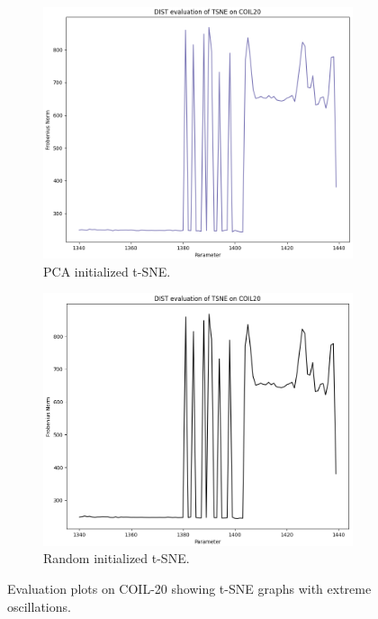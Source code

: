 \begin{figure}[!]
     \centering
     \begin{subfigure}[t]{0.49\columnwidth}
    	\centering
    	\includegraphics[width=\columnwidth]{images/dist_tsne_coil20_1375_1440_1.png}
    	\caption{PCA initialized t-SNE.}
        \label{fig:dist_tsne_coil20_1375_1440_1}
    \end{subfigure}
     \hfill
     \begin{subfigure}[t]{0.49\columnwidth}
    	\centering
    	\includegraphics[width=\columnwidth]{images/dist_tsne_coil20_1340_1440_1_random.png}
    	\caption{Random initialized t-SNE.}
        \label{fig:dist_tsne_coil20_1340_1440_1_random}
    \end{subfigure}
     \caption[Oscillation on t-SNE's Graphs]{Evaluation plots on COIL-20 showing t-SNE graphs with extreme oscillations.}
    \label{fig:osc_tsne}
\end{figure}

